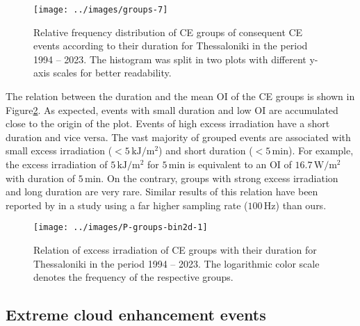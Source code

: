 \documentclass[preprint, 5p,
authoryear]{elsarticle} %
\begin{document}
\begin{figure}

{\centering \texttt{[image: ../images/groups-7]} 

}

\caption{Relative frequency distribution of CE groups of consequent CE events according to their duration for Thessaloniki in the period 1994 -- 2023. The histogram was split in two plots with different y-axis scales for better readability.}\label{fig:ceg-duration-distribution}
\end{figure}

The relation between the duration and the mean OI of the CE groups is
shown in Figure\nobreakspace{}\ref{fig:group-2d}. As expected, events
with small duration and low OI are accumulated close to the origin of
the plot. Events of high excess irradiation have a short duration and
vice versa. The vast majority of grouped events are associated with
small excess irradiation (\(<5\,\text{kJ}/\text{m}^2\)) and short
duration (\(<5\,\text{min}\)). For example, the excess irradiation of
\(5\,\text{kJ}/\text{m}^2\) for \(5\,\text{min}\) is equivalent to an OI
of \(16.7\,\text{W}/\text{m}^2\) with duration of \(5\,\text{min}\). On
the contrary, groups with strong excess irradiation and long duration
are very rare. Similar results of this relation have been reported by
\citet{Zhang2018} in a study using a far higher sampling rate
(\(100\,\text{Hz}\)) than ours.

\begin{figure}

{\centering \texttt{[image: ../images/P-groups-bin2d-1]} 

}

\caption{Relation of excess irradiation of CE groups with their duration for Thessaloniki in the period 1994 -- 2023. The logarithmic color scale denotes the frequency of the respective groups.}\label{fig:group-2d}
\end{figure}

\hypertarget{extreme-cloud-enhancement-events}{%
\subsection{Extreme cloud enhancement
events}\label{extreme-cloud-enhancement-events}}
\end{document}
